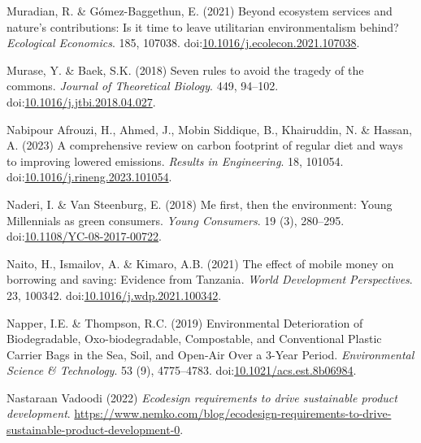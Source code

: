 \documentclass[
  letterpaper,
  DIV=11,
  numbers=noendperiod]{scrartcl}
\newlength{\cslhangindent}
\newenvironment{CSLReferences}[2] %
 {\begin{list}{}{%
  \setlength{\itemindent}{0pt}
  \setlength{\leftmargin}{0pt}
  \setlength{\parsep}{0pt}
  \ifodd #1
   \setlength{\leftmargin}{\cslhangindent}
   \setlength{\itemindent}{-1\cslhangindent}
  \fi
  \setlength{\itemsep}{#2\baselineskip}}}
 {\end{list}}
\begin{document}
\begin{CSLReferences}{0}{1}
Muradian, R. \& Gómez-Baggethun, E. (2021) Beyond ecosystem services and
nature's contributions: {Is} it time to leave utilitarian
environmentalism behind? \emph{Ecological Economics}. 185, 107038.
doi:\href{https://doi.org/10.1016/j.ecolecon.2021.107038}{10.1016/j.ecolecon.2021.107038}.

Murase, Y. \& Baek, S.K. (2018) Seven rules to avoid the tragedy of the
commons. \emph{Journal of Theoretical Biology}. 449, 94--102.
doi:\href{https://doi.org/10.1016/j.jtbi.2018.04.027}{10.1016/j.jtbi.2018.04.027}.

Nabipour Afrouzi, H., Ahmed, J., Mobin Siddique, B., Khairuddin, N. \&
Hassan, A. (2023) A comprehensive review on carbon footprint of regular
diet and ways to improving lowered emissions. \emph{Results in
Engineering}. 18, 101054.
doi:\href{https://doi.org/10.1016/j.rineng.2023.101054}{10.1016/j.rineng.2023.101054}.

Naderi, I. \& Van Steenburg, E. (2018) Me first, then the environment:
Young {Millennials} as green consumers. \emph{Young Consumers}. 19 (3),
280--295.
doi:\href{https://doi.org/10.1108/YC-08-2017-00722}{10.1108/YC-08-2017-00722}.

Naito, H., Ismailov, A. \& Kimaro, A.B. (2021) The effect of mobile
money on borrowing and saving: {Evidence} from {Tanzania}. \emph{World
Development Perspectives}. 23, 100342.
doi:\href{https://doi.org/10.1016/j.wdp.2021.100342}{10.1016/j.wdp.2021.100342}.

Napper, I.E. \& Thompson, R.C. (2019) Environmental {Deterioration} of
{Biodegradable}, {Oxo-biodegradable}, {Compostable}, and {Conventional
Plastic Carrier Bags} in the {Sea}, {Soil}, and {Open-Air Over} a
3-{Year Period}. \emph{Environmental Science \& Technology}. 53 (9),
4775--4783.
doi:\href{https://doi.org/10.1021/acs.est.8b06984}{10.1021/acs.est.8b06984}.

Nastaraan Vadoodi (2022) \emph{Ecodesign requirements to drive
sustainable product development}.
\url{https://www.nemko.com/blog/ecodesign-requirements-to-drive-sustainable-product-development-0}.


\end{CSLReferences}
\end{document}
